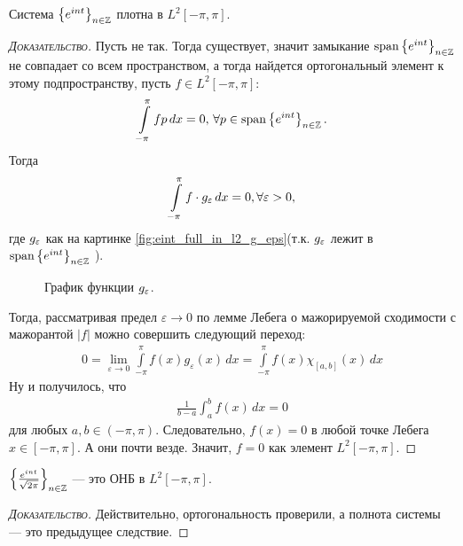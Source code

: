 \documentclass[../complex-analysis.tex]{subfiles}
\begin{document}
\begin{crly}
 Система $ \left\{e^{int}\right\}_{n \in \mathbb{Z}}  $ плотна в $ L^{2}[-\pi,\pi] $.
\end{crly}
\begin{proof}[\normalfont\textsc{Доказательство}]
	Пусть не так. Тогда существует, значит замыкание $\mathrm{span} \left\{ e^{int} \right\}_{n \in \mathbb{Z}}$ не совпадает со всем пространством, а тогда найдется ортогональный элемент к этому подпространству, пусть $ f \in L^{2}[-\pi,\pi] $:
 \begin{align*}
  \int\limits_{-\pi}^{\pi} f p \,dx = 0, \, \forall p \in \mathrm{span} \left\{ e^{int} \right\}_{n \in \mathbb{Z}}.
 \end{align*} Тогда 
 \begin{align*}
  \int\limits_{-\pi}^{\pi} f \cdot g_\varepsilon \, dx = 0, \forall \varepsilon > 0,
\end{align*} где $ g_\varepsilon $ как на картинке \eqref{fig:eint_full_in_l2_g_eps}(т.к. $g_{\varepsilon}$ лежит в $\mathrm{span} \left\{ e^{int} \right\}_{n \in \mathbb{Z}}$  ).

\begin{figure}[ht]
    \centering
	\caption{График функции $g_{\varepsilon}$. }
    \label{fig:eint_full_in_l2_g_eps}
\end{figure}

 Тогда, рассматривая предел $ \varepsilon \to 0 $ по лемме Лебега о мажорируемой сходимости с мажорантой $ \left| f \right| $ можно совершить следующий переход:
 \begin{align*}
     0 = \lim_{ \varepsilon \to 0 } \int\limits_{-\pi}^{\pi} f(x) g_{\varepsilon}(x) \,dx = \int\limits_{-\pi}^{\pi} f(x) \chi_{[a,b]}(x) \,dx
 \end{align*} Ну и получилось, что 
 \begin{align*}
  \frac{1}{b-a} \int_a^{b} f(x)\,dx = 0
 \end{align*} для любых $ a,  b \in(-\pi,\pi)$. Следовательно, $ f(x) = 0 $ в любой точке Лебега $ x \in [-\pi,\pi] $. А они почти везде. Значит, $ f = 0 $ как элемент $ L^{2}[-\pi,\pi] $.
\end{proof}

\begin{crly}
 $ \left\{\frac{e^{int}}{\sqrt{2\pi}}\right\}_{n \in \mathbb{Z}} $ --- это ОНБ в $ L^{2}[-\pi,\pi] $.
\end{crly}
\begin{proof}[\normalfont\textsc{Доказательство}]
 Действительно, ортогональность проверили, а полнота системы --- это предыдущее следствие.
\end{proof}
\end{document}
